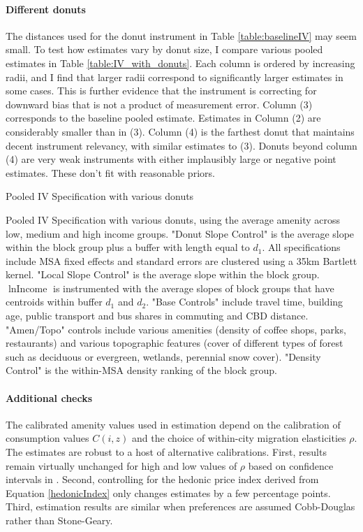 \documentclass[12pt]{article}
\begin{document}
	\clearpage
		\paragraph{Different donuts} The distances used for the donut instrument in Table \ref{table:baselineIV} may seem small. To test how estimates vary by donut size, I compare various pooled estimates in Table \ref{table:IV_with_donuts}. Each column is ordered by increasing radii, and I find that larger radii correspond to significantly larger estimates in some cases. This is further evidence that the instrument is correcting for downward bias that is not a product of measurement error. Column (3) corresponds to the baseline pooled estimate. Estimates in Column (2) are considerably smaller than in (3). Column (4) is the farthest donut that maintains decent instrument relevancy, with similar estimates to (3). Donuts beyond column (4) are very weak instruments with either implausibly large or negative point estimates. These don't fit with reasonable priors.
	
	\begin{landscape}
	\begin{table}[h]
		\caption{Pooled IV Specification with various donuts}\label{table:IV_with_donuts}
		\makebox[\linewidth]{}
		\caption*{Pooled IV Specification with various donuts, using the average amenity across low, medium and high income groups. "Donut Slope Control" is the average slope within the block group plus a buffer with length equal to $d_{1}$. All specifications include MSA fixed effects and standard errors are clustered using a 35km Bartlett kernel. "Local Slope Control" is the average slope within the block group. $\ln \text{Income}$ is instrumented with the average slopes of block groups that have centroids within buffer $d_{1}$ and $d_{2}$. "Base Controls" include travel time, building age, public transport and bus shares in commuting and CBD distance. "Amen/Topo" controls include various amenities (density of coffee shops, parks, restaurants) and various topographic features (cover of different types of forest such as deciduous or evergreen, wetlands, perennial snow cover). "Density Control" is the within-MSA density ranking of the block group.}
	\end{table}
	\end{landscape}
	
		\paragraph*{Additional checks} The calibrated amenity values used in estimation depend on the calibration of consumption values $C(i, z)$ and the choice of within-city migration elasticities $\rho$. The estimates are robust to a host of alternative calibrations. First, results remain virtually unchanged for high and low values of $\rho$ based on confidence intervals in \cite{BSH}. Second, controlling for the hedonic price index derived from Equation \eqref{hedonicIndex} only changes estimates by a few percentage points. Third, estimation results are similar when preferences are assumed Cobb-Douglas rather than Stone-Geary. 
	
\end{document}
